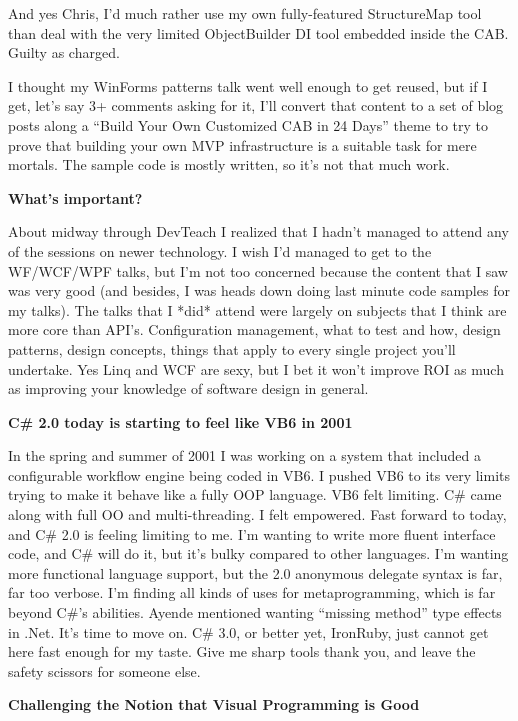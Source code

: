 \documentclass{article}
\begin{document}
{And yes Chris, I'd much rather use my own fully-featured StructureMap tool than deal with the very limited ObjectBuilder DI tool embedded inside the CAB.  Guilty as charged.

I thought my WinForms patterns talk went well enough to get reused, but if I get, let's say 3+ comments asking for it, I'll convert that content to a set of blog posts along a “Build Your Own Customized CAB in 24 Days” theme to try to prove that building your own MVP infrastructure is a suitable task for mere mortals.  The sample code is mostly written, so it's not that much work.

 
\Large {\textbf {What's important?}}

About midway through DevTeach I realized that I hadn't managed to attend any of the sessions on newer technology.  I wish I'd managed to get to the WF/WCF/WPF talks, but I'm not too concerned because the content that I saw was very good (and besides, I was heads down doing last minute code samples for my talks).  The talks that I *did* attend were largely on subjects that I think are more core than API's.  Configuration management, what to test and how, design patterns, design concepts, things that apply to every single project you'll undertake.  Yes Linq and WCF are sexy, but I bet it won't improve ROI as much as improving your knowledge of software design in general.

 
\Large {\textbf {C\# 2.0 today is starting to feel like VB6 in 2001}}

In the spring and summer of 2001 I was working on a system that included a configurable workflow engine being coded in VB6.  I pushed VB6 to its very limits trying to make it behave like a fully OOP language.  VB6 felt limiting.  C\# came along with full OO and multi-threading.  I felt empowered.  Fast forward to today, and C\# 2.0 is feeling limiting to me.  I'm wanting to write more fluent interface code, and C\# will do it, but it's bulky compared to other languages.  I'm wanting more functional language support, but the 2.0 anonymous delegate syntax is far, far too verbose.  I'm finding all kinds of uses for metaprogramming, which is far beyond C\#'s abilities.  Ayende mentioned wanting “missing method” type effects in .Net.  It's time to move on.  C\# 3.0, or better yet, IronRuby, just cannot get here fast enough for my taste.  Give me sharp tools thank you, and leave the safety scissors for someone else.

 
\Large {\textbf {Challenging the Notion that Visual Programming is Good}}

}
\end{document}
